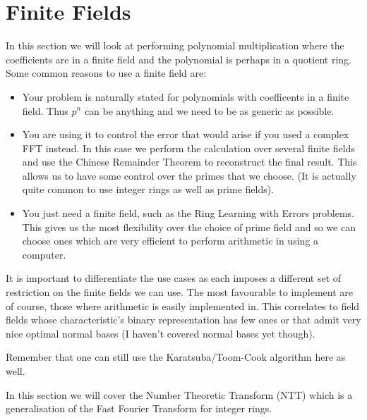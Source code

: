 \chapter{Finite Fields}\label{finite-fields}

In this section we will look at performing polynomial multiplication where the coefficients are in a finite field and the polynomial is perhaps in a quotient ring.\\

Some common reasons to use a finite field are:
\begin{itemize}
\item Your problem is naturally stated for polynomials with coefficents
in a finite field. Thus $p^n$ can be anything and we need to be as generic as possible.
\item You are using it to control the error that would arise if you used a complex FFT instead. In this case we perform the calculation over several finite fields and use the Chinese Remainder Theorem to reconstruct the final result. This allows us to have some control over the primes that we choose. (It is actually quite common to use integer rings as well as prime fields).
\item You just need a finite field, such as the Ring Learning with Errors problems. This gives us the most flexibility over the choice of prime field and so we can choose ones which are very efficient to perform arithmetic in using a computer.
\end{itemize}

It is important to differentiate the use cases as each imposes a different set of restriction on the finite fields we can use. The most favourable to implement are of course, those where arithmetic is easily implemented in. This correlates to field fields whose characteristic's binary representation has few ones or that admit very nice optimal normal bases (I haven't covered normal bases yet though).

Remember that one can still use the Karatsuba/Toom-Cook algorithm here as well.

In this section we will cover the Number Theoretic Transform (NTT) which is a generalisation of the Fast Fourier Transform for integer rings. 


